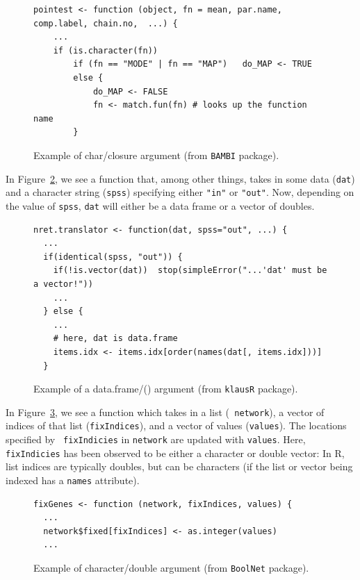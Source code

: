 \documentclass[acmsmall,10pt,review,anonymous]{acmart}\settopmatter{printfolios=true,printccs=false,printacmref=false}
\begin{document}
\begin{figure}[!hb]{\small\begin{lstlisting}[style=R]
pointest <- function (object, fn = mean, par.name, comp.label, chain.no,  ...) {
    ...
    if (is.character(fn)) 
        if (fn == "MODE" | fn == "MAP")   do_MAP <- TRUE
        else {
            do_MAP <- FALSE
            fn <- match.fun(fn) # looks up the function name
        }
\end{lstlisting}}\caption{Example of char/closure argument (from {\tt BAMBI} package).}\label{fig:charclos}\end{figure}

  In Figure~\ref{fig:dfdbl}, we see a
function that, among other things, takes in some data ({\tt dat}) and a
character string ({\tt spss}) specifying either {\tt "in"} or {\tt "out"}.
Now, depending on the value of {\tt spss}, {\tt dat} will either be a data
frame or a vector of doubles.

\begin{figure}[!hb]{\small\begin{lstlisting}[style=R]
nret.translator <- function(dat, spss="out", ...) {
  ...
  if(identical(spss, "out")) {
    if(!is.vector(dat))  stop(simpleError("...'dat' must be a vector!"))
    ...
  } else {
    ...
    # here, dat is data.frame
    items.idx <- items.idx[order(names(dat[, items.idx]))]
  }
\end{lstlisting}}\caption{Example of a data.frame/(\D) argument (from {\tt klausR} package).}\label{fig:dfdbl}\end{figure}

In Figure~\ref{fig:chardbl}, we see a function which takes in a list ({\tt
  network}), a vector of indices of that list ({\tt fixIndices}), and a
vector of values ({\tt values}).  The locations specified by {\tt
  fixIndicies} in {\tt network} are updated with {\tt values}.  Here, {\tt
  fixIndicies} has been observed to be either a character or double vector:
In R, list indices are typically doubles, but can be characters (if the list
or vector being indexed has a {\tt names} attribute).

\begin{figure}[!hb]{\small\begin{lstlisting}[style=R]
fixGenes <- function (network, fixIndices, values) {
  ...
  network$fixed[fixIndices] <- as.integer(values)
  ...
\end{lstlisting}}\caption{Example of character/double argument (from {\tt BoolNet} package).}\label{fig:chardbl}\end{figure}%
\end{document}
